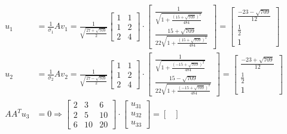 \documentclass[a4paper, spanish]{article}
\begin{document}
    \begin{align}
      u_1 &=
      \frac{1}{\sigma_1}Av_1 =
      \frac{1}{\sqrt{\frac{27 + \sqrt{709}}{2}}}
      \begin{bmatrix}
        1 & 1\\
        1 & 2\\
        2 & 4
      \end{bmatrix}
      \cdot
      \begin{bmatrix}
        \frac{1}{\sqrt{1 + \frac{(15 + \sqrt{709})^2}{484}}} \\
        \frac{15 + \sqrt{709}}{22\sqrt{1 + \frac{(15 + \sqrt{709})^2}{484}}}
      \end{bmatrix}
      =
      \begin{bmatrix}
        \frac{-23-\sqrt{709}}{12} \\
        \frac{1}{2} \\
        1
      \end{bmatrix} \\
      u_2 &=
      \frac{1}{\sigma_2}Av_2 =
      \frac{1}{\sqrt{\frac{27 - \sqrt{709}}{2}}}
      \begin{bmatrix}
        1 & 1\\
        1 & 2\\
        2 & 4
      \end{bmatrix}
      \cdot
      \begin{bmatrix}
        \frac{1}{\sqrt{1 + \frac{(- 15 + \sqrt{709})^2}{484}}} \\
        \frac{15 - \sqrt{709}}{22\sqrt{1 + \frac{(- 15 + \sqrt{709})^2}{484}}}
      \end{bmatrix}
      =
      \begin{bmatrix}
        \frac{-23+\sqrt{709}}{12} \\
        \frac{1}{2} \\
        1
      \end{bmatrix}\\
      AA^T u_3 &= 0
      \Rightarrow
      \begin{bmatrix}
        2 & 3 & 6 \\
        2 & 5 & 10 \\
        6 & 10 & 20
      \end{bmatrix}
      \cdot
      \begin{bmatrix}
        u_{31} \\
        u_{32} \\
        u_{33}
      \end{bmatrix}
      =
      \begin{bmatrix}

\end{bmatrix}
\end{align}
\end{document}
